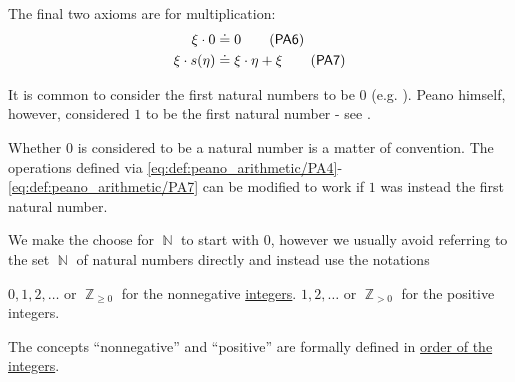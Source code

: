 \begin{definition}
\begin{thmenum}[resume=def:peano_arithmetic]
     The final two axioms are for multiplication:
    \begin{align}
      \xi \cdot 0       &\doteq 0                    \label{eq:def:peano_arithmetic/PA6}\tag{\logic{PA6}} \\
      \xi \cdot s(\eta) &\doteq \xi \cdot \eta + \xi \label{eq:def:peano_arithmetic/PA7}\tag{\logic{PA7}}
    \end{align}
  \end{thmenum}
\end{definition}

\begin{remark}\label{rem:peano_arithmetic_zero}
  It is common to consider the first natural numbers to be \( 0 \) (e.g. \cite[exmpl. 17.6]{OpenLogicFull}). Peano himself, however, considered \( 1 \) to be the first natural number - see \cite[1]{Peano1889}.

  Whether \( 0 \) is considered to be a natural number is a matter of convention. The operations defined via \eqref{eq:def:peano_arithmetic/PA4}-\eqref{eq:def:peano_arithmetic/PA7} can be modified to work if \( 1 \) was instead the first natural number.

  We make the choose for \( \BbbN \) to start with \( 0 \), however we usually avoid referring to the set \( \BbbN \) of natural numbers directly and instead use the notations
  \begin{thmenum}
     \( 0, 1, 2, \ldots \) or \( \BbbZ_{\geq 0} \) for the nonnegative \hyperref[def:set_of_integers]{integers}.
     \( 1, 2, \ldots \) or \( \BbbZ_{> 0} \) for the positive integers.
  \end{thmenum}

  The concepts \enquote{nonnegative} and \enquote{positive} are formally defined in \hyperref[def:set_of_integers/order]{order of the integers}.
\end{remark}

